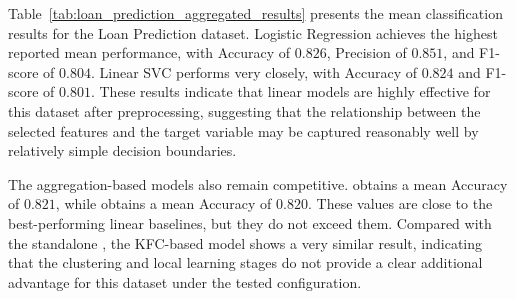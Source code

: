 \begin{table}[H]
    \centering
    \caption{Mean Loan Prediction Classification Results}
    \label{tab:loan_prediction_aggregated_results}
    \small
\end{table}




\hs Table~\ref{tab:loan_prediction_aggregated_results} presents the mean classification results for the Loan Prediction dataset. Logistic Regression achieves the highest reported mean performance, with Accuracy of $0.826$, Precision of $0.851$, and F1-score of $0.804$. Linear SVC performs very closely, with Accuracy of $0.824$ and F1-score of $0.801$. These results indicate that linear models are highly effective for this dataset after preprocessing, suggesting that the relationship between the selected features and the target variable may be captured reasonably well by relatively simple decision boundaries.

The aggregation-based models also remain competitive.  obtains a mean Accuracy of $0.821$, while  obtains a mean Accuracy of $0.820$. These values are close to the best-performing linear baselines, but they do not exceed them. Compared with the standalone , the KFC-based model shows a very similar result, indicating that the clustering and local learning stages do not provide a clear additional advantage for this dataset under the tested configuration.

